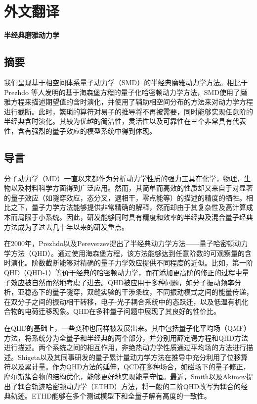 \cleardoublepage
\chapter{外文翻译}
\begin{center}
\bfseries
半经典磨雅动力学
\end{center}
\section*{摘要}
我们呈现基于相空间体系量子动力学（SMD）的半经典磨雅动力学方法。相比于Prezhdo    等人发明的基于海森堡方程的量子化哈密顿动力学方法，SMD使用了磨雅方程来描述期望值的含时演化，并使用了辅助相空间分布的方法来对动力学方程进行截断。此时，繁琐的算符对易子的推导将不再被需要，同时能够实现任意阶的半经典含时演化。其较为优越的简洁性，灵活性以及可靠性在三个非常具有代表性，含有强烈的量子效应的模型系统中得到体现。

\section{导言}
分子动力学（MD）一直以来都作为分析动力学性质的强力工具在化学，物理，生物以及材料科学方面得到广泛应用。然而，其简单而高效的性质却又来自于对显著的量子效应（如隧穿效应，态分叉，退相干，零点能等）的描述的精度的牺牲。相比之下，量子力学方法能够提供非常精确的解释，然而却由于其复杂性及高计算成本而局限于小系统。因此，研发能够同时具有精度和效率的半经典及混合量子经典方法成为了过去几十年以来的研发重点。

在2000年，Prezhdo以及Pereverzev提出了半经典动力学方法——量子哈密顿动力学方法（QHD）。通过使用海森堡方程，该方法能够达到任意阶数的可观察量的含时演化。阶数截断能够对精确的量子力学效应提供不同程度的近似。比如，第一阶QHD（QHD-1）等价于经典的哈密顿动力学，而在添加更高阶的修正的过程中量子效应被自然而然地考虑了进去。QHD被应用于多种问题，如分子振动频率分析，亚稳态下的量子隧穿，双缝实验的干涉条纹，不同振动模式之间的能量传递，在双分子之间的振动相干转移，电子-光子耦合系统中的态跃迁，以及低温有机化合物的电荷迁移现象。QHD在多种量子问题中展现了其良好的性价比。

在QHD的基础上，一些变种也同样被发展出来。其中包括量子化平均场（QMF）方法，将系统分为全量子和半经典的两个部分，并分别用薛定谔方程和QHD方法进行描述。两个系统之间的相互作用，非绝热动力学性质通过平均场的方法进行描述。Shigeta以及其同事研发的量子累计量动力学方法在推导中充分利用了位移算符以及累计量。作为QHD方法的延伸，QCD在多种场合，如磁场下的量子修正，摩尔斯簇合物的结构优化，能够更好地实现能量守恒。最近，Smith以及Akimov提出了耦合轨迹哈密顿动力学（ETHD）方法，将一般的二阶QHD改写为耦合的经典轨迹。ETHD能够在多个测试模型下和全量子解有高度的一致性。

